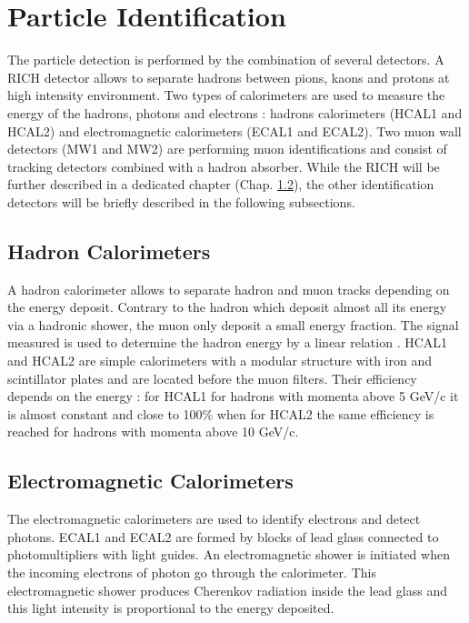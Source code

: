 
\section{Particle Identification}

The particle detection is performed by the combination of several detectors. A RICH detector allows to separate hadrons between pions, kaons and protons
at high intensity environment. Two types of calorimeters are used to measure the energy of the hadrons, photons and electrons : hadrons calorimeters
(HCAL1 and HCAL2) and electromagnetic calorimeters (ECAL1 and ECAL2). Two muon wall detectors (MW1 and MW2) are performing muon identifications and
consist of tracking detectors combined with a hadron absorber. While the RICH will be further described in a dedicated chapter (Chap. \ref{}), the other
identification detectors will be briefly described in the following subsections.

\subsection{Hadron Calorimeters}

A hadron calorimeter allows to separate hadron and muon tracks depending on the energy deposit. Contrary to the hadron which deposit almost all its energy
via a hadronic shower, the muon only deposit a small energy fraction. The signal measured is used to determine the hadron energy by a linear relation \cite{}.
HCAL1 and HCAL2 are simple calorimeters with a modular structure with iron and scintillator plates and are located before the muon filters. Their efficiency
depends on the energy : for HCAL1 for hadrons with momenta above 5 GeV/c it is almost constant and close to 100\% when for HCAL2 the same efficiency is reached
for hadrons with momenta above 10 GeV/c.

\subsection{Electromagnetic Calorimeters}

The electromagnetic calorimeters are used to identify electrons and detect photons. ECAL1 and ECAL2 are formed by blocks of lead glass connected to photomultipliers
with light guides. An electromagnetic shower is initiated when the incoming electrons of photon go through the calorimeter. This electromagnetic shower produces
Cherenkov radiation inside the lead glass and this light intensity is proportional to the energy deposited.

